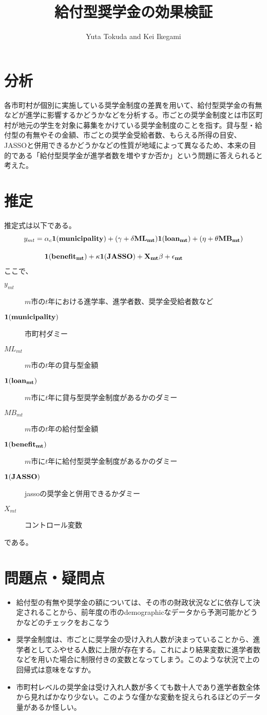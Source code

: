 \documentclass{jsarticle}
\begin{document}
\title{給付型奨学金の効果検証}
\author{Yuta Tokuda and Kei Ikegami}
\maketitle

\section{分析}
各市町村が個別に実施している奨学金制度の差異を用いて、給付型奨学金の有無などが進学に影響するかどうかなどを分析する。市ごとの奨学金制度とは市区町村が地元の学生を対象に募集をかけている奨学金制度のことを指す。貸与型・給付型の有無やその金額、市ごとの奨学金受給者数、もらえる所得の目安、JASSOと併用できるかどうかなどの性質が地域によって異なるため、本来の目的である「給付型奨学金が進学者数を増やすか否か」という問題に答えられると考えた。

\section{推定}
推定式は以下である。
\begin{align*}
y_{mt}&=\alpha_{c}\bf1 (municipality)+(\gamma+\delta ML_{mt})\bf1(loan_{mt})+(\eta+\theta MB_{mt})\\[10pt]& \quad\  \bf1(benefit_{mt})+\kappa\bf1(JASSO)+X_{mt}\beta+\epsilon_{mt}
\end{align*}
ここで、
	\begin{description}
	        \item[$y_{mt}$] $m$市の$t$年における進学率、進学者数、奨学金受給者数など
		\item[$\bf1 (municipality)$]  市町村ダミー
		\item[$ML_{mt}$]  $m$市の$t$年の貸与型金額
		\item[$\bf1(loan_{mt})$]  $m$市に$t$年に貸与型奨学金制度があるかのダミー
		\item[$MB_{mt}$]  $m$市の$t$年の給付型金額
		\item[$\bf1(benefit_{mt})$]  $m$市に$t$年に給付型奨学金制度があるかのダミー
		\item[$\bf1(JASSO)$]  jassoの奨学金と併用できるかダミー
	　　 \item[$X_{mt}$]  コントロール変数
	\end{description}
	である。
\section{問題点・疑問点}
\begin{itemize}
\item 給付型の有無や奨学金の額については、その市の財政状況などに依存して決定されることから、前年度の市のdemographicなデータから予測可能かどうかなどのチェックをおこなう
\item 奨学金制度は、市ごとに奨学金の受け入れ人数が決まっていることから、進学者としてふやせる人数に上限が存在する。これにより結果変数に進学者数などを用いた場合に制限付きの変数となってしまう。このような状況で上の回帰式は意味をなすか。
\item 市町村レベルの奨学金は受け入れ人数が多くても数十人であり進学者数全体から見ればかなり少ない。このような僅かな変動を捉えられるほどのデータ量があるか怪しい。
\end{itemize}
\end{document}

